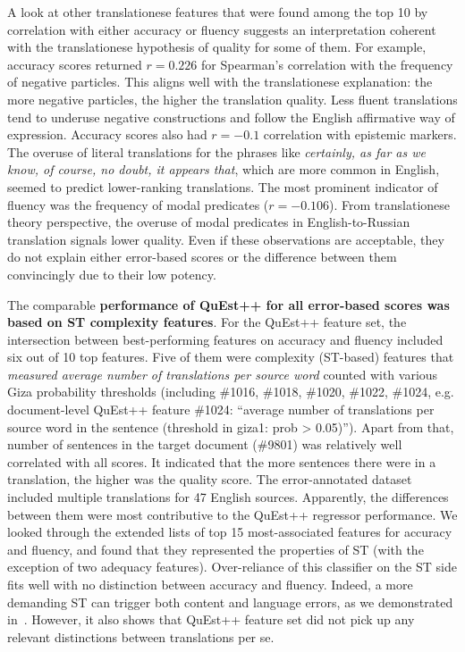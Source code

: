 \label{pg:errors_some_coherence_with_translationese_theory_of_quality}
A look at other translationese features that were found among the top 10 by correlation with either accuracy or fluency suggests an interpretation coherent with the translationese hypothesis of quality for some of them. 
For example, accuracy scores returned $r=0.226$ for Spearman's correlation with the frequency of negative particles. This aligns well with the translationese explanation: the more negative particles, the higher the translation quality. Less fluent translations tend to underuse negative constructions and follow the English affirmative way of expression. Accuracy scores also had $r=-0.1$ correlation with epistemic markers. The overuse of literal translations for the phrases like \textit{certainly, as far as we know, of course, no doubt, it appears that}, which are more common in English, seemed to predict lower-ranking translations. The most prominent indicator of fluency was the frequency of modal predicates ($r=-0.106$). From translationese theory perspective, the overuse of modal predicates in English-to-Russian translation signals lower quality.
Even if these observations are acceptable, they do not explain either error-based scores or the difference between them convincingly due to their low potency.   

\label{pg:quest_feats4err}
The comparable \textbf{performance of QuEst++ for all error-based scores was based on ST complexity features}.
For the QuEst++ feature set, the intersection between best-performing features on accuracy and fluency included six out of 10 top features. Five of them were complexity (ST-based) features that \textit{measured average number of translations per source word} counted with various Giza probability thresholds (including \#1016, \#1018, \#1020, \#1022, \#1024, e.g. document-level QuEst++ feature \#1024: ``average number of translations per source word in the sentence (threshold in giza1: prob > 0.05)''). Apart from that, number of sentences in the target document (\#9801) was relatively well correlated with all scores. It indicated that the more sentences there were in a translation, the higher was the quality score.
The error-annotated dataset included multiple translations for 47 English sources. Apparently, the differences between them were most contributive to the QuEst++ regressor performance. We looked through the extended lists of top 15 most-associated features for accuracy and fluency, and found that they represented the properties of ST (with the exception of two adequacy features). Over-reliance of this classifier on the ST side fits well with no distinction between accuracy and fluency. Indeed, a more demanding ST can trigger both content and language errors, as we demonstrated in~\cite{Kunilovskaya2023err}.
However, it also shows that QuEst++ feature set did not pick up any relevant distinctions between translations per se. 

